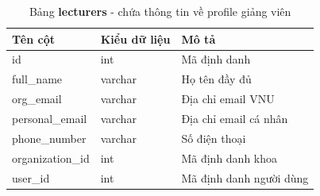 \documentclass[./../main.tex]{subfiles}
\begin{document}
\begin{table}[H]
	\caption[Bảng lecturers]{Bảng \textbf{lecturers} - chứa thông tin về profile giảng viên}
	\label{tab:db_lecturers}
	\begin{tabular}{|l|l|l|}
		\hline
		\textbf{Tên cột} & \textbf{Kiểu dữ liệu} & \textbf{Mô tả}          \\ \hline
		id               & int                   & Mã định danh            \\ \hline
		full\_name       & varchar               & Họ tên đầy đủ           \\ \hline
		org\_email       & varchar               & Địa chỉ email VNU       \\ \hline
		personal\_email  & varchar               & Địa chỉ email cá nhân   \\ \hline
		phone\_number    & varchar               & Số điện thoại           \\ \hline
		organization\_id & int                   & Mã định danh khoa       \\ \hline
		user\_id         & int                   & Mã định danh người dùng \\ \hline
	\end{tabular}%
\end{table}
\end{document}
